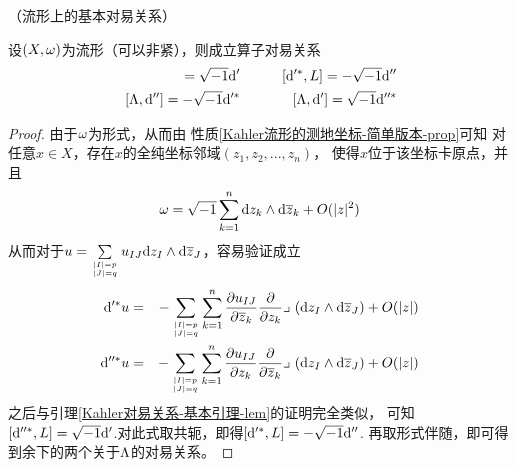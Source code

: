 


\begin{thm}（\Kahler 流形上的基本对易关系）
\label{Kahler 流形上的基本对易关系-thm}

设$(X,\omega)$为\Kahler 流形（可以非紧），则成立算子对易关系
\begin{eqnarray*}
  [\td''^*,L]=\ii\td'
&\qquad&
  [\td'^*,L]=-\ii\td''
\\
  \,[\Lmd,\td'']=-\ii\td'^*
&\qquad&
  \,[\Lmd,\td']=\ii\td''^*
\end{eqnarray*}
\end{thm}


\begin{proof}由于$\omega$为\Kahler 形式，从而由
性质\ref{Kahler流形的测地坐标-简单版本-prop}可知
对任意$x\in X$，存在$x$的全纯坐标邻域$(z_1,z_2,...,z_n)$，
使得$x$位于该坐标卡原点，并且
$$
  \omega=\sqrt{-1}\sum_{k=1}^{n}\mathrm{d} z_k\wedge\mathrm{d}\overline{z}_k
  +O(|z|^2)
$$
从而对于$u=\sum\limits_{|I|=p\atop|J|=q}
u_{IJ}\mathrm{d} z_I\wedge\mathrm{d}\overline{z}_J$，容易验证成立
\begin{eqnarray*}
     \mathrm{d}'^*u
&=&
     -\sum_{|I|=p\atop|J|=q}
      \sum_{k=1}^{n}
        \frac{\partial u_{IJ}} {\partial \overline{z}_k}
        \frac{\partial } {\partial z_k}\lrcorner\,
        \left(\mathrm{d} z_I\wedge\mathrm{d}\overline{z}_J\right)+O(|z|)
\\
     \mathrm{d}''^*u
&=&
     -\sum_{|I|=p\atop|J|=q}
      \sum_{k=1}^{n}
        \frac{\partial u_{IJ}} {\partial z_k}
        \frac{\partial } {\partial \overline{z}_k}\lrcorner\,
        \left(\mathrm{d} z_I\wedge\mathrm{d}\overline{z}_J\right)+O(|z|)
\end{eqnarray*}
之后与引理\ref{Kahler对易关系-基本引理-lem}的证明完全类似，
可知$[\mathrm{d}''^*,L]=\sqrt{-1}\mathrm{d}'$.对此式取共轭，即得$[\mathrm{d}'^*,L]=-\sqrt{-1}\mathrm{d}''$.
再取形式伴随，即可得到余下的两个关于$\Lambda$的对易关系。
\end{proof}


